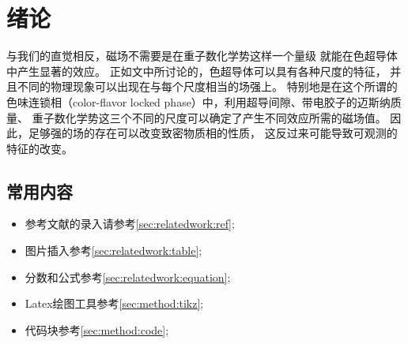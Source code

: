 
\chapter{绪论}
\label{chpt:introduction}

与我们的直觉相反，磁场不需要是在重子数化学势这样一个量级
就能在色超导体中产生显著的效应。
正如文中\cite{}所讨论的，色超导体可以具有各种尺度的特征，
并且不同的物理现象可以出现在与每个尺度相当的场强上。
特别地是在这个所谓的色味连锁相（color-flavor locked phase）中，利用超导间隙、带电胶子的迈斯纳质量、
重子数化学势这三个不同的尺度可以确定了产生不同效应所需的磁场值。
因此，足够强的场的存在可以改变致密物质相的性质，
这反过来可能导致可观测的特征的改变。

\section{常用内容}

\begin{itemize}
  \item 参考文献的录入请参考\ref{sec:relatedwork:ref};
  \item 图片插入参考\ref{sec:relatedwork:table};
  \item 分数和公式参考\ref{sec:relatedwork:equation};
  \item Latex绘图工具参考\ref{sec:method:tikz};
  \item 代码块参考\ref{sec:method:code};
\end{itemize} 